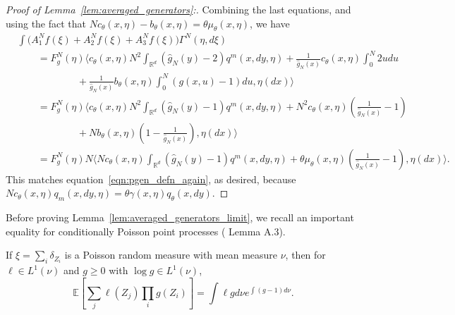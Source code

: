 \documentclass[EJP]{ejpecp} %
\renewcommand{\hat}{\widehat}
\newcommand{\IE}{\mathbb E}
\newcommand{\IR}{\mathbb R}
\newcommand{\lp}{\xi}              %
\begin{document}
\begin{proof}[Proof of Lemma~\ref{lem:averaged_generators}:]
Combining the last equations,
and using the fact that
$N c_\theta(x,\eta) - b_\theta(x,\eta) = \theta \mu_\theta(x,\eta)$,
we have 
\begin{align*}
&
    \int \Bigg( A^N_1 f(\xi) + A^N_2 f(\xi) + A^N_3 f(\xi) \Bigg) \Gamma^N(\eta,d\lp)
\\ &\qquad =
    F_g^N(\eta) \bigg\langle
        c_\theta(x,\eta) N^2 \int_{\IR^d} (\hat g_N(y) - 2) q^m(x,dy,\eta)
        +
        \frac{1}{\hat g_N(x)} c_\theta(x,\eta) \int_0^N 2u du
\\ &\qquad \qquad \qquad {}
        +
        \frac{1}{\hat g_N(x)} b_\theta(x,\eta) \int_0^N (g(x,u) - 1) du
    , \eta(dx) \bigg\rangle 
\\ &\qquad =
    F_g^N(\eta) \bigg\langle
        c_\theta(x,\eta) N^2 \int_{\IR^d} (\hat g_N(y) - 1) q^m(x,dy,\eta)
        +
        N^2 c_\theta(x,\eta) \left(\frac{1}{\hat g_N(x)} - 1\right)
\\ &\qquad \qquad \qquad {}
        +
        N b_\theta(x,\eta) \left(1 - \frac{1}{\hat g_N(x)}\right)
    , \eta(dx) \bigg\rangle 
\\ &\qquad =
    F_g^N(\eta) N \bigg\langle
        N c_\theta(x,\eta) \int_{\IR^d} (\hat g_N(y) - 1) q^m(x,dy,\eta)
        +
        \theta \mu_\theta(x,\eta) \left(\frac{1}{\hat g_N(x)} - 1\right)
    , \eta(dx) \bigg\rangle  .
\end{align*}
This matches equation~\eqref{eqn:pgen_defn_again}, as desired,
because $N c_\theta(x,\eta) q_m(x,dy,\eta) = \theta \gamma(x,\eta) q_\theta(x,dy)$.
\end{proof}

Before proving Lemma~\ref{lem:averaged_generators_limit},
we recall an important equality for conditionally
Poisson point processes (\cite{kurtz/rodrigues:2011} Lemma A.3).

\begin{lemma} \label{lem:poisson_eqn}
If $\lp = \sum_{i}\delta_{Z_i}$ is a Poisson random measure with mean measure $\nu$, 
then for $\ell \in L^{1}(\nu)$ and $g\geq0$ with $\log g \in L^{1}(\nu)$,
\begin{equation}
\IE\left[\sum_{j} \ell(Z_j) \prod_{i}g(Z_i)\right] = \int \ell g d\nu e^{\int (g-1) d \nu}.
\end{equation}
\end{lemma}
\end{document}
